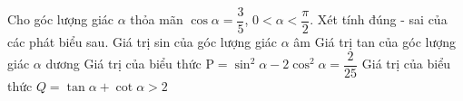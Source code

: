 \begin{ex}%
 Cho góc lượng giác $\alpha$ thỏa mãn $\cos  \alpha=\dfrac{3}{5}$, $ 0<\alpha<\dfrac{\pi}{2}$. Xét tính đúng - sai của các phát biểu sau.
 \choiceTF 
  {Giá trị sin của  góc lượng giác $\alpha$ âm}
  { \True Giá trị tan của góc  lượng giác $\alpha$ dương}
  {Giá trị của biểu thức $\mathrm{P}=\sin ^2 \alpha-2 \cos  ^2 \alpha=\dfrac{2}{25}$}
  { \True Giá trị của biểu thức  $Q=\tan \alpha+\cot \alpha>2$}
\end{ex}

